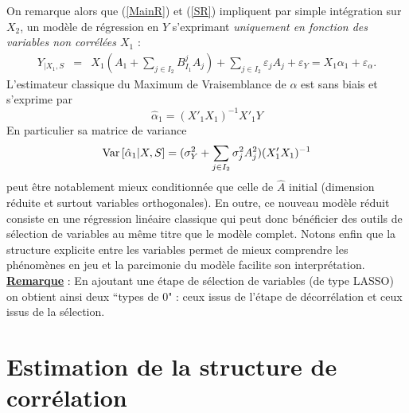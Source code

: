 \documentclass[12pt]{article}
\begin{document}
On remarque alors que (\ref{MainR}) et (\ref{SR}) impliquent par simple intégration sur $X_2$, un modèle de régression en $Y$ s'exprimant {\it uniquement en fonction des variables non corrélées $X_1$} :
\begin{eqnarray}
	Y_{|X_1,S}&=&X_1 (A_{1}+ \sum_{j \in I_2}B^{j}_{I_1}A_{j})+  \sum_{j \in I_2}\varepsilon_{j}A_{j}+\varepsilon_Y 
					= X_1\alpha_{1}+ \varepsilon_{\alpha}. \label{Trueexpl} 			
\end{eqnarray}		
L'estimateur classique du Maximum de Vraisemblance de $\alpha$ est sans biais et s'exprime par	
\begin{equation}
	\hat{\alpha}_{1}= (X'_{1} X_1)^{-1}X'_{1}Y  
\end{equation}
En particulier sa matrice de variance 
\begin{equation}
	{\rm Var}\,[\hat{\alpha}_{1}|X,S]= (\sigma^2_Y+\sum_{j \in I_2}\sigma^2_{j}A_{j}^2 )(X'_{1} X_{1})^{-1}
\end{equation}
		peut être notablement mieux conditionnée que celle de $\hat A$ initial (dimension réduite et surtout variables orthogonales).						
	En outre, ce nouveau modèle réduit consiste en une régression linéaire classique qui peut donc bénéficier des outils de sélection de variables au même titre que le modèle complet.			
		 Notons enfin que la structure explicite entre les variables permet de mieux comprendre les phénomènes en jeu et la parcimonie du modèle facilite son interprétation. 
\\ 
		\textbf{\underline{Remarque}} : En ajoutant une étape de sélection de variables (de type LASSO) on obtient ainsi deux  ``types de $0$"  : ceux issus de l'étape de décorrélation et ceux issus de la sélection.
		
\section{Estimation de la structure de corrélation}\label{secMCMC}
	 	
	
\end{document}
